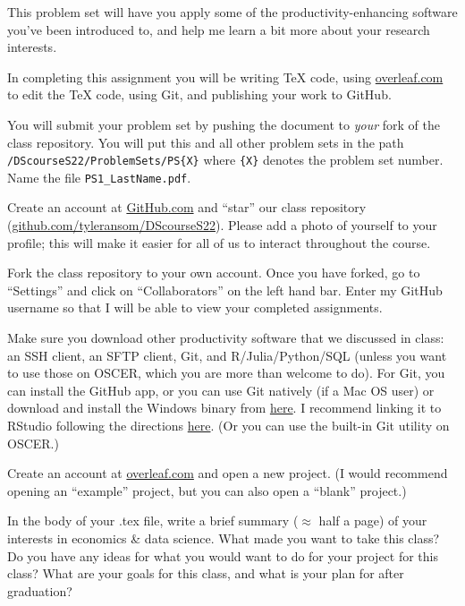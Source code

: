 \documentclass[12pt,english]{exam}
\begin{document}
This problem set will have you apply some of the productivity-enhancing software you've been introduced to, and help me learn a bit more about your research interests.

In completing this assignment you will be writing TeX code, using \url{overleaf.com} to edit the TeX code, using Git, and publishing your work to GitHub.

You will submit your problem set by pushing the document to \emph{your} fork of the class repository. You will put this and all other problem sets in the path \texttt{/DScourseS22/ProblemSets/PS\{X\}} where \texttt{\{X\}} denotes the problem set number. Name the file \texttt{PS1\_LastName.pdf}.

\begin{questions}
\question Create an account at \url{GitHub.com} and ``star'' our class repository (\url{github.com/tyleransom/DScourseS22}). Please add a photo of yourself to your profile; this will make it easier for all of us to interact throughout the course.

\question Fork the class repository to your own account. Once you have forked, go to ``Settings'' and click on ``Collaborators'' on the left hand bar. Enter my GitHub username so that I will be able to view your completed assignments.

\question Make sure you download other productivity software that we discussed in class: an SSH client, an SFTP client, Git, and R/Julia/Python/SQL (unless you want to use those on OSCER, which you are more than welcome to do). For Git, you can install the GitHub app, or you can use Git natively (if a Mac OS user) or download and install the Windows binary from \href{https://git-scm.com/download/win}{here}. I recommend linking it to RStudio following the directions \href{https://raw.githack.com/uo-ec607/lectures/master/02-git/02-Git.html#13}{here}. (Or you can use the built-in Git utility on OSCER.)

\question Create an account at \url{overleaf.com} and open a new project. (I would recommend opening an ``example'' project, but you can also open a ``blank'' project.)

\question In the body of your .tex file, write a brief summary ($\approx$ half a page) of your interests in economics \& data science. What made you want to take this class? Do you have any ideas for what you would want to do for your project for this class? What are your goals for this class, and what is your plan for after graduation?


\end{questions}
\end{document}
